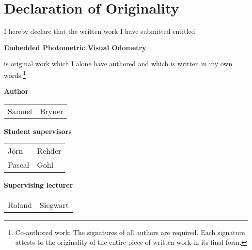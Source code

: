 \section*{Declaration of Originality}

\vspace{1cm}

I hereby declare that the written work I have submitted entitled

\vspace{0.5cm}

\textbf{Embedded Photometric Visual Odometry}

\vspace{0.5cm}

is original work which I alone have authored and which is written in my own words.\footnote{Co-authored work: The signatures of all authors are required. Each signature attests to the originality of the entire piece of written work in its final form.}

\vspace{1cm}

\textbf{Author}

\vspace{0.5cm}

\begin{tabular}{ p{5cm} p{5cm} }
  Samuel & Bryner \\
\end{tabular}

\vspace{0.5cm}

\textbf{Student supervisors}

\vspace{0.5cm}

\begin{tabular}{ p{5cm} p{5cm} }
  Jörn & Rehder \\
  Pascal & Gohl \\
\end{tabular}

\vspace{0.5cm}

\textbf{Supervising lecturer}

\vspace{0.5cm}

\begin{tabular}{ p{5cm} p{5cm} }
  Roland & Siegwart \\
\end{tabular}

\vspace{1cm}

